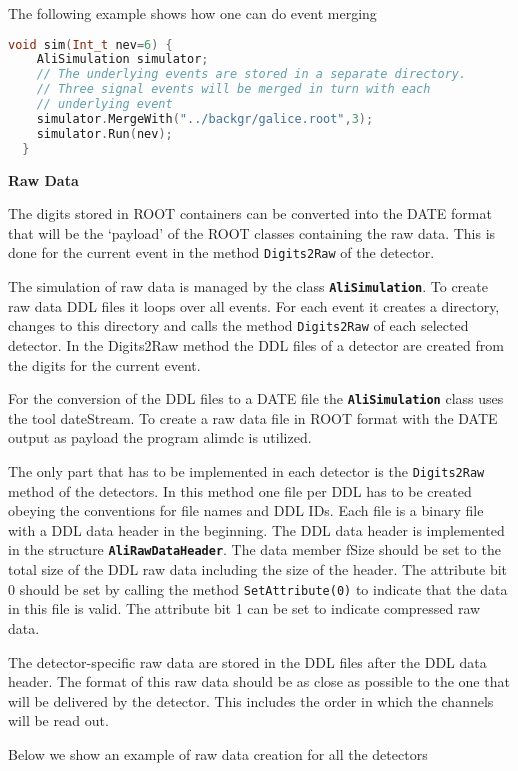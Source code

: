 \documentclass[12pt,a4paper,twoside]{article}
\newcommand{\class}[1]{\texttt{\textbf{#1}}\xspace}
\newcommand{\method}[1]{\texttt{#1}\xspace}
\begin{document}
The following example shows how one can do event merging

\begin{lstlisting}[language=C++, title={Event merging}]
  void sim(Int_t nev=6) {
    AliSimulation simulator;
    // The underlying events are stored in a separate directory.
    // Three signal events will be merged in turn with each
    // underlying event
    simulator.MergeWith("../backgr/galice.root",3);
    simulator.Run(nev);
  }
\end{lstlisting}

\noindent
\textbf{Raw Data}

The digits stored in ROOT containers can be converted into the DATE\cite{DATE}
format that will be the `payload' of the ROOT classes containing the
raw data. This is done for the current event in the method
\method{Digits2Raw} of the detector.

The simulation of raw data is managed by the class \class{AliSimulation}. To
create raw data DDL files it loops over all events. For each event it
creates a directory, changes to this directory and calls the method
\method{Digits2Raw} of each selected detector. In the Digits2Raw method the DDL
files of a detector are created from the digits for the current
event. 

For the conversion of the DDL files to a DATE file the
\class{AliSimulation} class uses the tool dateStream. To create a raw
data file in ROOT format with the DATE output as payload the program alimdc is
utilized.

The only part that has to be implemented in each detector is
the \method{Digits2Raw} method of the detectors. In this method one file per
DDL has to be created obeying the conventions for file names and DDL
IDs. Each file is a binary file with a DDL data header in the
beginning. The DDL data header is implemented in the structure
\class{AliRawDataHeader}. The data member fSize should be set to the total
size of the DDL raw data including the size of the header. The
attribute bit 0 should be set by calling the method \method{SetAttribute(0)} to
indicate that the data in this file is valid. The attribute bit 1 can
be set to indicate compressed raw data.

The detector-specific raw data are stored in the DDL files after the
DDL data header. The format of this raw data should be as close as
possible to the one that will be delivered by the detector. This
includes the order in which the channels will be read out.

Below we show an example of raw data creation for all the detectors
\end{document}
